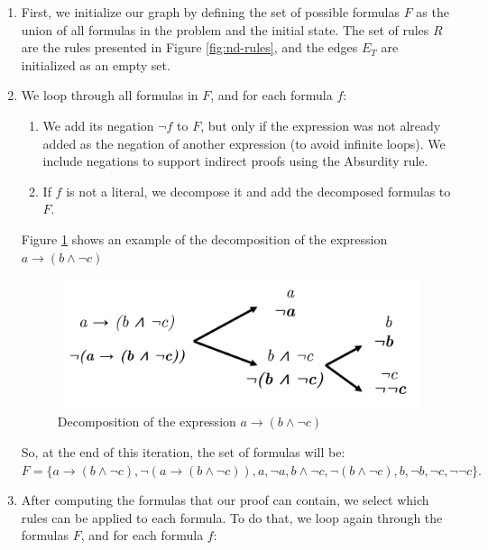 \documentclass[runningheads]{llncs}
\begin{document}
\begin{enumerate}
    \item First, we initialize our graph by defining the set of possible formulas \(F\) as the union of all formulas in the problem and the initial state. The set of rules \(R\) are the rules presented in Figure \ref{fig:nd-rules}, and the edges \(E_T\) are initialized as an empty set.

    \item We loop through all formulas in \(F\), and for each formula \(f\):

    \begin{enumerate}
         \item We add its negation \(\lnot f\) to \(F\), but only if the expression was not already added as the negation of another expression (to avoid infinite loops). We include negations to support indirect proofs using the Absurdity rule.
         \item If \(f\) is not a literal, we decompose it and add the decomposed formulas to \(F\).
    \end{enumerate}

    Figure \ref{fig:tg-exps} shows an example of the decomposition of the expression \(a \to ( b \land \lnot c)\) 
\vspace{-1em}
    \begin{figure}[H]
        \centering
        \includegraphics[width=0.6\linewidth]{resources/decomposition.jpg}
        \caption{Decomposition of the expression \(a \to ( b \land \lnot c)\)}
        \label{fig:tg-exps}
    \end{figure}
\vspace{-2em}
    So, at the end of this iteration, the set of formulas will be: \(
    F = \{ a \to ( b \land \lnot c), \lnot(a \to ( b \land \lnot c)), a, \lnot a, b \land \lnot c, \lnot(b \land \lnot c), b, \lnot b, \lnot c, \lnot\lnot c \}.
    \)

    \item After computing the formulas that our proof can contain, we select which rules can be applied to each formula. To do that, we loop again through the formulas \(F\), and for each formula \(f\):


\end{enumerate}
\end{document}
